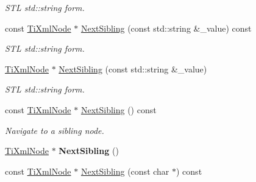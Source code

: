 \begin{DoxyCompactItemize}
\begin{DoxyCompactList}\small\item\em S\+TL std\+::string form. \end{DoxyCompactList}\item 
const \hyperlink{class_ti_xml_node}{Ti\+Xml\+Node} $\ast$ \hyperlink{class_ti_xml_node_a1b94d2f7fa7ab25a5a8e8d4340c449c9}{Next\+Sibling} (const std\+::string \&\+\_\+value) const \hypertarget{class_ti_xml_node_a1b94d2f7fa7ab25a5a8e8d4340c449c9}{}\label{class_ti_xml_node_a1b94d2f7fa7ab25a5a8e8d4340c449c9}

\begin{DoxyCompactList}\small\item\em S\+TL std\+::string form. \end{DoxyCompactList}\item 
\hyperlink{class_ti_xml_node}{Ti\+Xml\+Node} $\ast$ \hyperlink{class_ti_xml_node_a1757c1f4d01e8c9596ffdbd561c76aea}{Next\+Sibling} (const std\+::string \&\+\_\+value)\hypertarget{class_ti_xml_node_a1757c1f4d01e8c9596ffdbd561c76aea}{}\label{class_ti_xml_node_a1757c1f4d01e8c9596ffdbd561c76aea}

\begin{DoxyCompactList}\small\item\em S\+TL std\+::string form. \end{DoxyCompactList}\item 
const \hyperlink{class_ti_xml_node}{Ti\+Xml\+Node} $\ast$ \hyperlink{class_ti_xml_node_af854baeba384f5fe9859f5aee03b548e}{Next\+Sibling} () const \hypertarget{class_ti_xml_node_af854baeba384f5fe9859f5aee03b548e}{}\label{class_ti_xml_node_af854baeba384f5fe9859f5aee03b548e}

\begin{DoxyCompactList}\small\item\em Navigate to a sibling node. \end{DoxyCompactList}\item 
\hyperlink{class_ti_xml_node}{Ti\+Xml\+Node} $\ast$ {\bfseries Next\+Sibling} ()\hypertarget{class_ti_xml_node_a4d05f7b1d7b470ac6887edd072d4892a}{}\label{class_ti_xml_node_a4d05f7b1d7b470ac6887edd072d4892a}

\item 
const \hyperlink{class_ti_xml_node}{Ti\+Xml\+Node} $\ast$ \hyperlink{class_ti_xml_node_acaf9dc17531ac041f602f9ad579573ea}{Next\+Sibling} (const char $\ast$) const \hypertarget{class_ti_xml_node_acaf9dc17531ac041f602f9ad579573ea}{}\label{class_ti_xml_node_acaf9dc17531ac041f602f9ad579573ea}


\end{DoxyCompactItemize}
